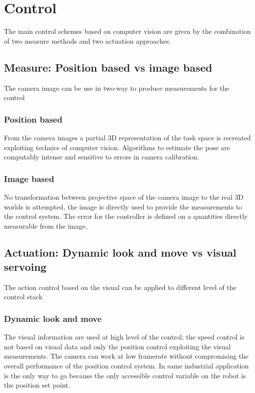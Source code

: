 \section{Control}

The main control schemes based on computer vision are given by the combination of two measure methods and two actuation approaches.

\subsection{Measure: Position based vs image based}

The camera image can be use in two-way to produce measurements for the control

\subsubsection{Position based}

From the camera images a partial 3D representation of the task space is recreated exploiting technics of computer vision.
Algorithms to estimate the pose are computably intense and sensitive to errors in camera calibration.

\subsubsection{Image based}

No transformation between projective space of the camera image to the real 3D worlds is attempted, the image is directly used to provide the measurements to the control system.
The error for the controller is defined on a quantities directly measurable from the image.

\subsection{Actuation: Dynamic look and move vs visual servoing}

The action control based on the visual can be applied to different level of the control stack

\subsubsection{Dynamic look and move}

The visual information are used at high level of the control;
the speed control is not based on visual data and only the position control exploiting the visual measurements.
The camera can work at low framerate without compromising the overall performance of the position control system.
In same industrial application is the only way to go because the only accessible control variable on the robot is the position set point.

